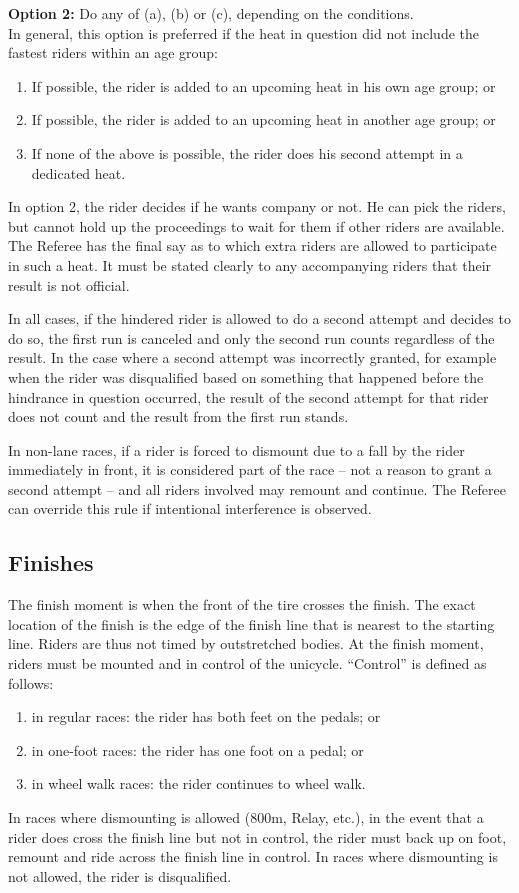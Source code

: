 \textbf{Option 2:}
Do any of (a), (b) or (c), depending on the conditions.\\
In general, this option is preferred if the heat in question did not include the fastest riders within an age group:
\begin{enumerate}[label=(\alph*)]
\item If possible, the rider is added to an upcoming heat in his own age group; or
\item If possible, the rider is added to an upcoming heat in another age group; or
\item If none of the above is possible, the rider does his second attempt in a dedicated heat.
\end{enumerate}
In option 2, the rider decides if he wants company or not.
He can pick the riders, but cannot hold up the proceedings to wait for them if other riders are available.
The Referee has the final say as to which extra riders are allowed to participate in such a heat.
It must be stated clearly to any accompanying riders that their result is not official. 

In all cases, if the hindered rider is allowed to do a second attempt and decides to do so, the first run is canceled and only the second run counts regardless of the result.
In the case where a second attempt was incorrectly granted, for example when the rider was disqualified based on something that happened before the hindrance in question occurred, the result of the second attempt for that rider does not count and the result from the first run stands.

In non-lane races, if a rider is forced to dismount due to a fall by the rider immediately in front, it is considered part of the race -- not a reason to grant a second attempt -- and all riders involved may remount and continue.
The Referee can override this rule if intentional interference is observed.

\subsection{Finishes \label{sec:track-field_finishes}}

The finish moment is when the front of the tire crosses the finish.
The exact location of the finish is the edge of the finish line that is nearest to the starting line.
Riders are thus not timed by outstretched bodies.
At the finish moment, riders must be mounted and in control of the unicycle.
``Control'' is defined as follows: 
\begin{enumerate}[label=(\alph*)]
\item in regular races: the rider has both feet on the pedals; or
\item in one-foot races: the rider has one foot on a pedal; or
\item in wheel walk races: the rider continues to wheel walk.
\end{enumerate}
In races where dismounting is allowed (800m, Relay, etc.\@), in the event that a rider does cross the finish line but not in control, the rider must back up on foot, remount and ride across the finish line in control.
In races where dismounting is not allowed, the rider is disqualified.

